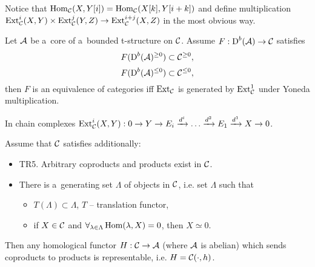     \begin{definition}
        Notice that $\operatorname{Hom}_{\mathcal{C}}(X,Y[i]) = \operatorname{Hom}_{\mathcal{C}}(X[k],Y[i+k])$
        and define multiplication 
        $\operatorname{Ext}_{\mathcal{C}}^i(X,Y) \times \operatorname{Ext}_{\mathcal{C}}^j(Y,Z) \to 
        \operatorname{Ext}_{\mathcal{C}}^{i+j}(X,Z)$
        in the most obvious way.
    \end{definition}
    
    \begin{theorem}
        Let $\mathcal{A}$ be a~core of a~bounded t-structure
        on $\mathcal{C}$. Assume $F: \operatorname{D}^b(\mathcal{A}) \to \mathcal{C}$
        satisfies
        $$F(\operatorname{D}^b(\mathcal{A})^{\geq 0}) \subset \mathcal{C}^{\geq 0},$$
        $$F(\operatorname{D}^b(\mathcal{A})^{\leq 0}) \subset \mathcal{C}^{\leq 0},$$
        then $F$ is an equivalence of categories 
        iff $\operatorname{Ext}_{\mathcal{C}}$ is generated by $\operatorname{Ext}_{\mathcal{C}}^1$ 
        under Yoneda multiplication.
    \end{theorem}
    
    \begin{remark}
        In chain complexes
        $\operatorname{Ext}_{\mathcal{C}}^i(X,Y):
        0 \to Y \to E_i \xrightarrow{d^i}
        \ldots \xrightarrow{d^2} E_1
        \xrightarrow{d^1} X
        \to 0$.
    \end{remark}
    
    \begin{theorem}
        Assume that $\mathcal{C}$ satisfies additionally:
        \begin{itemize}
            \item TR5. Arbitrary coproducts and products exist in $\mathcal{C}$.
            \item There is a~generating set $\Lambda$
            of objects in $\mathcal{C}$, i.e. set $\Lambda$ such that
            \begin{itemize}
                \item $T(\Lambda) \subset \Lambda$, $T$ -- translation functor,
                \item if $X \in \mathcal{C}$ and 
                $\forall_{\lambda \in \Lambda} \operatorname{Hom}(\lambda,X) = 0$,
                then $X \simeq 0$.
            \end{itemize}
        \end{itemize}
        Then any homological functor
        $H:\mathcal{C} \to \mathcal{A}$ (where $\mathcal{A}$ is abelian)
        which sends coproducts to products is representable,
        i.e. $H = \mathcal{C}(\cdot, h)$.
    \end{theorem}


 
 
